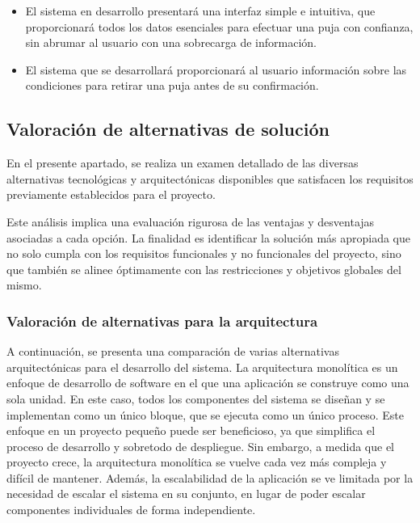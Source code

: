 \begin{itemize}
    \item El sistema en desarrollo presentará una interfaz simple e intuitiva, que proporcionará todos los datos esenciales para efectuar una puja con confianza, sin abrumar al usuario con una sobrecarga de información.
    \item El sistema que se desarrollará proporcionará al usuario información sobre las condiciones para retirar una puja antes de su confirmación.
\end{itemize}



\subsection{Valoración de alternativas de solución}
En el presente apartado, se realiza un examen detallado de las diversas alternativas tecnológicas y arquitectónicas disponibles que satisfacen los requisitos previamente establecidos para el proyecto. 

Este análisis implica una evaluación rigurosa de las ventajas y desventajas asociadas a cada opción. La finalidad es identificar la solución más apropiada que no solo cumpla con los requisitos funcionales y no funcionales del proyecto, sino que también se alinee óptimamente con las restricciones y objetivos globales del mismo.

\subsubsection{Valoración de alternativas para la arquitectura}
A continuación, se presenta una comparación de varias alternativas arquitectónicas para el desarrollo del sistema.
La arquitectura monolítica es un enfoque de desarrollo de software en el que una aplicación se construye como una sola unidad. En este caso, todos los componentes del sistema se diseñan y se implementan como un único bloque, que se ejecuta como un único proceso.
Este enfoque en un proyecto pequeño puede ser beneficioso, ya que simplifica el proceso de desarrollo y sobretodo de despliegue. Sin embargo, a medida que el proyecto crece, la arquitectura monolítica se vuelve cada vez más compleja y difícil de mantener. Además, la escalabilidad de la aplicación se ve limitada por la necesidad de escalar el sistema en su conjunto, en lugar de poder escalar componentes individuales de forma independiente.


